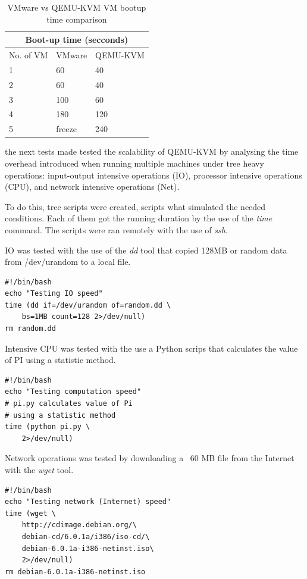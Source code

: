 \begin{table}
\begin{tabular}{|l|l|l|}
\hline
\multicolumn{3}{|c|}{Boot-up time (secconds)} \\
\hline
No. of VM & VMware & QEMU-KVM \\ \hline
1 & 60 & 40 \\
2 & 60 & 40 \\
3 & 100 & 60 \\
4 & 180 & 120 \\
5 & freeze & 240\\
\hline
\end{tabular}
\caption{VMware vs QEMU-KVM VM bootup time comparison}
\label{table:virt_bootup_time_comparison}
\end{table}



the next tests made tested the scalability of QEMU-KVM by analysing the
time overhead introduced when running multiple machines under tree heavy
operations: input-output intensive operations (IO), processor intensive
operations (CPU), and network intensive operations (Net).

To do this, tree scripts were created, scripts what simulated the needed
conditions. Each of them got the running duration by the use of the
\emph{time} command. The scripts were ran remotely with the use of
\emph{ssh}.

IO was tested with the use of the \emph{dd} tool that copied
128MB or random data from /dev/urandom to a local file. 

\begin{verbatim}
#!/bin/bash
echo "Testing IO speed"
time (dd if=/dev/urandom of=random.dd \
	bs=1MB count=128 2>/dev/null)
rm random.dd

\end{verbatim}

Intensive CPU was tested with the use a Python scrips that calculates the
value of PI using a statistic method.

\begin{verbatim}
#!/bin/bash
echo "Testing computation speed"
# pi.py calculates value of Pi
# using a statistic method
time (python pi.py \
	2>/dev/null)
\end{verbatim}

Network operations was tested by downloading a ~60 MB file from the
Internet with the \emph{wget} tool.

\begin{verbatim}
#!/bin/bash
echo "Testing network (Internet) speed"
time (wget \
	http://cdimage.debian.org/\
	debian-cd/6.0.1a/i386/iso-cd/\
	debian-6.0.1a-i386-netinst.iso\
	2>/dev/null)
rm debian-6.0.1a-i386-netinst.iso
\end{verbatim}

